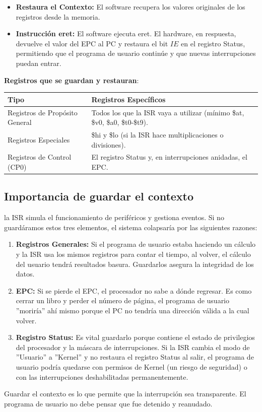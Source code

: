 \documentclass[]{article}
\begin{document}
\begin{enumerate}
				\begin{itemize}
					\item \textbf{Restaura el Contexto:} El software recupera los valores originales de los registros desde la memoria.
					\item \textbf{Instrucción eret:} El software ejecuta eret. El hardware, en respuesta, devuelve el valor del EPC al PC y restaura el bit $IE$ en el registro Status, permitiendo que el programa de usuario continúe y que nuevas interrupciones puedan entrar.
				\end{itemize}
			\textbf{Registros que se guardan y restauran}:\\
			\begin{tabular}{|>{\centering\arraybackslash}m{5cm}|>{\centering\arraybackslash}m{6cm}|}
				\hline
				Tipo & Registros Específicos \\
				\hline
				Registros de Propósito General & Todos los que la ISR vaya a utilizar (mínimo \$at, \$v0, \$a0, \$t0-\$t9). \\
				\hline
				Registros Especiales & \$hi y \$lo (si la ISR hace multiplicaciones o divisiones). \\
				\hline
				Registros de Control (CP0) & El registro Status y, en interrupciones anidadas, el EPC. \\
				\hline
			\end{tabular}
		\end{enumerate}
	\subsection{Importancia de guardar el contexto}
		la ISR simula el funcionamiento de periféricos y gestiona eventos. Si no guardáramos estos tres elementos, el sistema colapsaría por las siguientes razones:
		\begin{enumerate}
			\item \textbf{Registros Generales:} Si el programa de usuario estaba haciendo un cálculo y la ISR usa los mismos registros para contar el tiempo, al volver, el cálculo del usuario tendrá resultados basura. Guardarlos asegura la integridad de los datos.
			\item \textbf{EPC:} Si se pierde el EPC, el procesador no sabe a dónde regresar. Es como cerrar un libro y perder el número de página, el programa de usuario ''moriría'' ahí mismo porque el PC no tendría una dirección válida a la cual volver.
			\item \textbf{Registro Status:} Es vital guardarlo porque contiene el estado de privilegios del procesador y la máscara de interrupciones. Si la ISR cambia el modo de ''Usuario'' a ''Kernel'' y no restaura el registro Status al salir, el programa de usuario podría quedarse con permisos de Kernel (un riesgo de seguridad) o con las interrupciones deshabilitadas permanentemente.
		\end{enumerate}
		Guardar el contexto es lo que permite que la interrupción sea transparente. El programa de usuario no debe pensar que fue detenido y reanudado.
\end{document}

